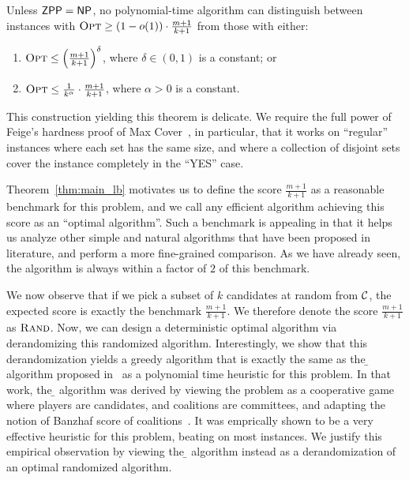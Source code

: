 \begin{theorem}
\label{thm:main_lb}
\label{thm:hardness}
Unless $\mathsf{ZPP} = \mathsf{NP}$, no polynomial-time algorithm can distinguish between instances with ${\normalfont\textsc{Opt}} \ge (1 - o(1)) \cdot \frac{m+1}{k+1}$ from those with either:
\begin{enumerate}
    \item ${\normalfont\textsc{Opt}} \le \left(\frac{m+1}{k+1}\right)^{\delta}$, where $\delta \in (0,1)$ is a constant; or
    \item ${\normalfont\textsc{Opt}} \le \frac{1}{k^{\alpha}} \cdot \frac{m+1}{k+1}$, where $\alpha > 0$ is a constant.
\end{enumerate}
\end{theorem}
This construction yielding this theorem is delicate. We require the full power of Feige's hardness proof of {\sc Max Cover}~\cite{Feige}, in particular, that it works on ``regular'' instances where each set has the same size, and where a collection of disjoint sets cover the instance completely in the ``YES'' case.

Theorem~\ref{thm:main_lb} motivates us to define the score $\frac{m+1}{k+1}$ as a reasonable benchmark for this problem, and we call any efficient algorithm achieving this score as an ``optimal algorithm''. Such a benchmark is appealing in that it helps us analyze other simple and natural algorithms that have been proposed in literature, and perform a more fine-grained comparison. As we have already seen, the \g{} algorithm is always within a factor of $2$ of this benchmark. 

We now observe that if we pick a subset of $k$ candidates at random from $\mathcal{C}$, the expected score is exactly the benchmark $\frac{m+1}{k+1}$. We therefore denote the score $\frac{m+1}{k+1}$ as ${\normalfont\textsc{Rand}}$. Now, we can design a deterministic optimal algorithm via derandomizing this randomized algorithm. Interestingly, we show that this derandomization yields a greedy algorithm that is exactly the same as the \b{} algorithm proposed in~\cite{Heuristics} as a polynomial time heuristic for this problem. In that work, the \b{} algorithm was derived by viewing the problem as a cooperative game where players are candidates, and coalitions are committees, and adapting the notion of Banzhaf score of coalitions~\cite{Banzhaf,dubeyS}. It was emprically shown to be a very effective heuristic for this problem, beating \g{} on most instances. We justify this empirical observation by viewing the \b{} algorithm instead as a derandomization of an optimal randomized algorithm. 

